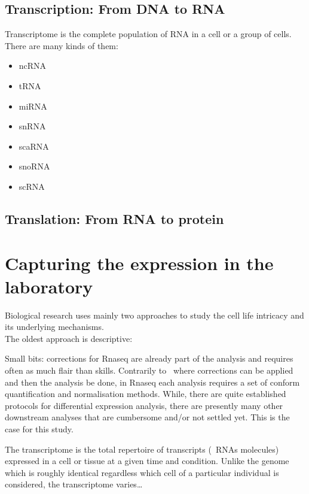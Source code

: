 \subsection{Transcription: From \gls{DNA} to \gls{RNA}}

Transcriptome is the complete population of \gls{RNA} in a cell or a group of
cells. There are many kinds of them:
\begin{itemize}
    \item \gls{ncRNA}
    \item \gls{tRNA}
    \item \gls{miRNA}
    \item \gls{snRNA}
    \item \gls{scaRNA}
    \item \gls{snoRNA}
    \item \gls{scRNA}
\end{itemize}

\subsection{Translation: From \gls{RNA} to protein}



\section{Capturing the expression in the laboratory}

Biological research uses mainly two approaches to
study the cell life intricacy and its underlying mechanisms.\\
The oldest approach is descriptive:


Small bits: corrections for Rnaseq are already part of the analysis and
requires often as much flair than skills.
Contrarily to \Dnaseq\ where corrections can be applied  and
then the analysis be done, in Rnaseq each analysis requires a set of conform
quantification and normalisation methods.
While, there are quite established protocols for differential expression analysis,
there are presently many other downstream analyses that are cumbersome
and/or not settled yet. This is the case for this study.


The transcriptome is the total repertoire of transcripts (\ie\ \glspl{RNA}
molecules) expressed in a cell or tissue at a given time and condition. Unlike
the genome which is roughly identical regardless which cell of a particular
individual is considered, the transcriptome varies\ldots

